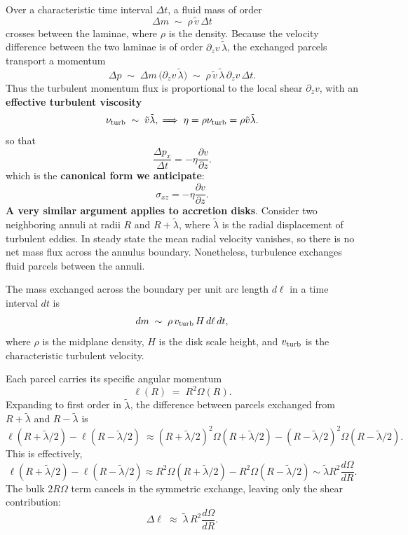 Over a characteristic time interval $\Delta t$, a fluid mass of order
\[
\Delta m \;\sim\; \rho\, \tilde{v}\,\Delta t
\]
crosses between the laminae, where $\rho$ is the density. Because the velocity difference between the two laminae is of order $\partial_z v \,\tilde{\lambda}$,  the exchanged parcels transport a momentum
\[
\Delta p \;\sim\; \Delta m \,\bigl(\partial_z v \,\tilde{\lambda} \bigr)
      \;\sim\; \rho\, \tilde{v} \,\tilde{\lambda} \,\partial_z v \,\Delta t .
\]
Thus the turbulent momentum flux is proportional to the local shear $\partial_z v$, with an \textbf{effective turbulent viscosity}
\[
\nu_{\rm turb} \;\sim\; \tilde{v}\tilde{\lambda} ,\implies \eta = \rho\nu_{\rm turb} = \rho \tilde{v}\tilde{\lambda}.
\]
so that
\[
\frac{\Delta p_x}{\Delta t} = - \eta \frac{\partial v}{\partial z}.
\]
which is the \textbf{canonical form we anticipate}:
\[
\sigma_{xz} = - \eta \frac{\partial v}{\partial z}.
\]
\medskip
\textbf{A very similar argument applies to accretion disks}.  Consider two neighboring annuli at radii $R$ and $R+\tilde{\lambda}$, where $\tilde{\lambda}$ is the radial displacement of turbulent eddies. In steady state the mean radial velocity vanishes, so there is no net mass flux across the annulus boundary. Nonetheless, turbulence exchanges fluid parcels between the annuli.

The mass exchanged across the boundary per unit arc length $d\ell$ in a time interval $dt$ is
\[
dm \;\sim\; \rho \, v_{\rm turb} \, H \, d\ell \, dt ,
\]
where $\rho$ is the midplane density, $H$ is the disk scale height, and $v_{\rm turb}$ is the characteristic turbulent velocity.  

Each parcel carries its specific angular momentum
\[
\ell(R) \;=\; R^2 \Omega(R).
\]
Expanding to first order in $\tilde{\lambda}$, the difference between parcels exchanged from 
$R+\tilde{\lambda}$ and $R-\tilde{\lambda}$ is
\[
\ell(R+\tilde{\lambda}/2) - \ell(R-\tilde{\lambda}/2)
   \;\approx (R+\tilde{\lambda}/2)^2\Omega(R+\tilde{\lambda}/2) - (R-\tilde{\lambda}/2)^2\Omega(R-\tilde{\lambda}/2).
\]
This is effectively,
\[
\ell(R+\tilde{\lambda}/2)-\ell(R-\tilde{\lambda}/2) \approx R^2 \Omega(R+\tilde{\lambda}/2) - R^2\Omega(R-\tilde{\lambda}/2) \sim\tilde{\lambda} R^2 \frac{d\Omega}{dR}.
\]
The bulk $2R\Omega$ term cancels in the symmetric exchange, leaving only the shear contribution:
\[
\Delta \ell \;\approx\;\tilde{\lambda} \, R^2 \frac{d\Omega}{dR}.
\]

